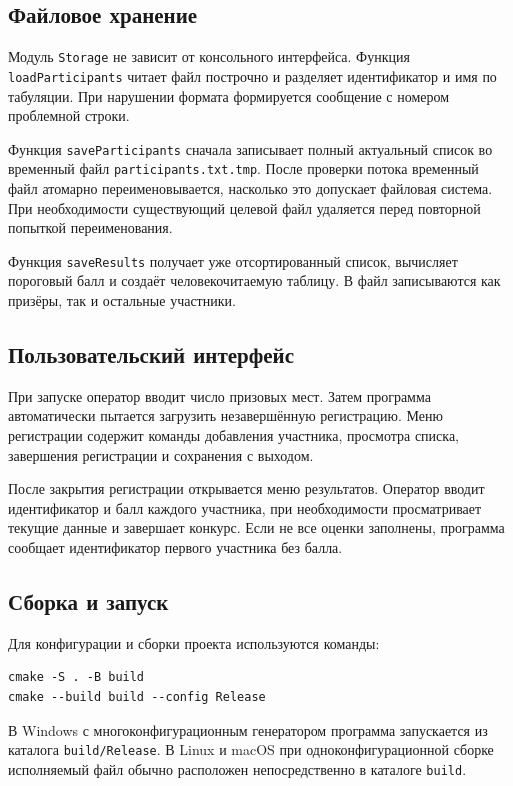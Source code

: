 \documentclass[14pt,a4paper]{extarticle}
\newcommand{\code}[1]{\texttt{#1}}
\begin{document}
\subsection{Файловое хранение}

Модуль \code{Storage} не зависит от консольного интерфейса. Функция \code{loadParticipants} читает файл построчно и разделяет идентификатор и имя по табуляции. При нарушении формата формируется сообщение с номером проблемной строки.

Функция \code{saveParticipants} сначала записывает полный актуальный список во временный файл \code{participants.txt.tmp}. После проверки потока временный файл атомарно переименовывается, насколько это допускает файловая система. При необходимости существующий целевой файл удаляется перед повторной попыткой переименования.

Функция \code{saveResults} получает уже отсортированный список, вычисляет пороговый балл и создаёт человекочитаемую таблицу. В файл записываются как призёры, так и остальные участники.

\subsection{Пользовательский интерфейс}

При запуске оператор вводит число призовых мест. Затем программа автоматически пытается загрузить незавершённую регистрацию. Меню регистрации содержит команды добавления участника, просмотра списка, завершения регистрации и сохранения с выходом.

После закрытия регистрации открывается меню результатов. Оператор вводит идентификатор и балл каждого участника, при необходимости просматривает текущие данные и завершает конкурс. Если не все оценки заполнены, программа сообщает идентификатор первого участника без балла.

\subsection{Сборка и запуск}

Для конфигурации и сборки проекта используются команды:
\begin{Verbatim}[fontsize=\small]
cmake -S . -B build
cmake --build build --config Release
\end{Verbatim}

В Windows с многоконфигурационным генератором программа запускается из каталога \code{build/Release}. В Linux и macOS при одноконфигурационной сборке исполняемый файл обычно расположен непосредственно в каталоге \code{build}.
\end{document}
